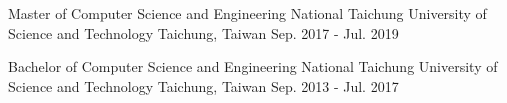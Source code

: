 

\begin{cventries}

  \cventry
    {Master of Computer Science and Engineering} %
    {National Taichung University of Science and Technology} %
    {Taichung, Taiwan} %
    {Sep. 2017 - Jul. 2019} %
    {
    }
    
\cventry
    {Bachelor of Computer Science and Engineering} %
    {National Taichung University of Science and Technology} %
    {Taichung, Taiwan} %
    {Sep. 2013 - Jul. 2017} %
    {
    }
\end{cventries}
